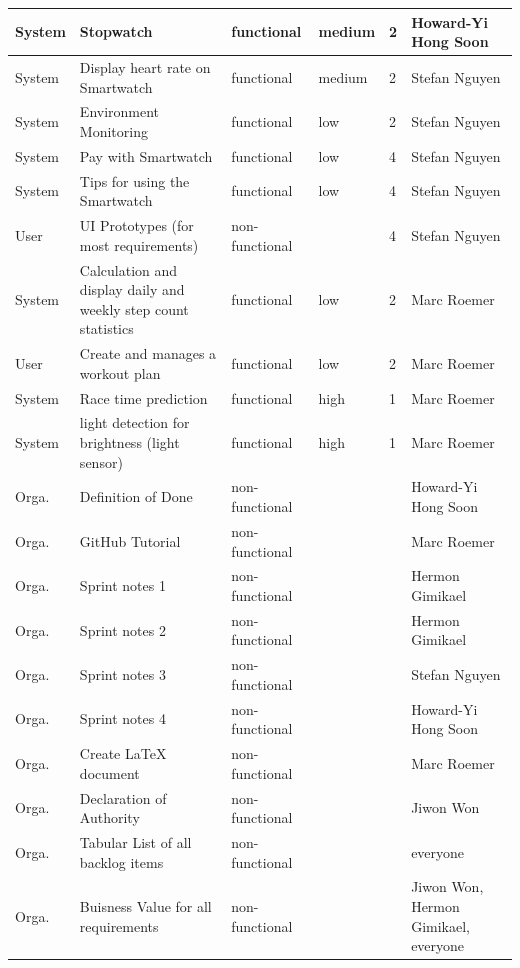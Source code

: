 \documentclass{article}
\begin{document}
\begin{center}
\begin{tabularx}{\textwidth}{|p{}|X|p{}|p{}|p{}|p{}|}
        System & Stopwatch & functional & medium & 2 & Howard-Yi Hong Soon \\ \hline
        System & Display heart rate on Smartwatch & functional & medium &  2 & Stefan Nguyen \\ \hline
        System & Environment Monitoring & functional & low &  2 & Stefan Nguyen \\ \hline
        System & Pay with Smartwatch & functional & low &  4 & Stefan Nguyen \\ \hline
        System & Tips for using the Smartwatch & functional & low &  4 & Stefan Nguyen \\ \hline
        User & UI Prototypes (for most requirements) & non-functional  &  &  4 & Stefan Nguyen \\ \hline
		System & Calculation and display daily and weekly step count statistics & functional & low &  2 & Marc Roemer \\ \hline
		User & Create and manages a workout plan & functional & low &  2 & Marc Roemer \\ \hline
		System & Race time prediction & functional & high &  1 & Marc Roemer \\ \hline 
		System & light detection for brightness (light sensor) & functional & high &  1 & Marc Roemer \\ \hline
		Orga.&Definition of Done&non-functional&&&Howard-Yi Hong Soon\\ \hline
		Orga.&GitHub Tutorial&non-functional&&&Marc Roemer\\ \hline
		Orga.&Sprint notes 1&non-functional&&&Hermon Gimikael\\ \hline
		Orga.&Sprint notes 2&non-functional&&&Hermon Gimikael\\ \hline
		Orga.&Sprint notes 3&non-functional&&&Stefan Nguyen\\ \hline
		Orga.&Sprint notes 4&non-functional&&&Howard-Yi Hong Soon\\ \hline
		Orga.&Create LaTeX document&non-functional&&&Marc Roemer\\ \hline
		Orga.&Declaration of Authority&non-functional&&&Jiwon Won\\ \hline
		Orga.&Tabular List of all backlog items&non-functional&&&everyone\\ \hline
		Orga.&Buisness Value for all requirements&non-functional&&&Jiwon Won, Hermon Gimikael, everyone\\ \hline

	\end{tabularx}
\end{center}
\end{document}
